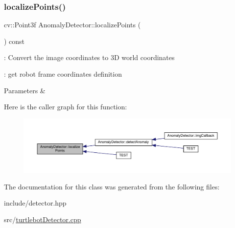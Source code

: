 \subsubsection{\texorpdfstring{localize\+Points()}{localizePoints()}}
{\footnotesize\ttfamily cv\+::\+Point3f Anomaly\+Detector\+::localize\+Points (\begin{DoxyParamCaption}{ }\end{DoxyParamCaption}) const}



\+: Convert the image coordinates to 3D world coordinates 

\+: get robot frame coordinates definition


\begin{DoxyParams}{Parameters}
{\em } & \\
\hline
\end{DoxyParams}
Here is the caller graph for this function\+:\nopagebreak
\begin{figure}[H]
\begin{center}
\leavevmode
\includegraphics[width=350pt]{class_anomaly_detector_aa97b11cf22fdd64d5f38e4d49025bda1_icgraph}
\end{center}
\end{figure}


The documentation for this class was generated from the following files\+:\begin{DoxyCompactItemize}
\item 
include/detector.\+hpp\item 
src/\hyperlink{turtlebot_detector_8cpp}{turtlebot\+Detector.\+cpp}\end{DoxyCompactItemize}

